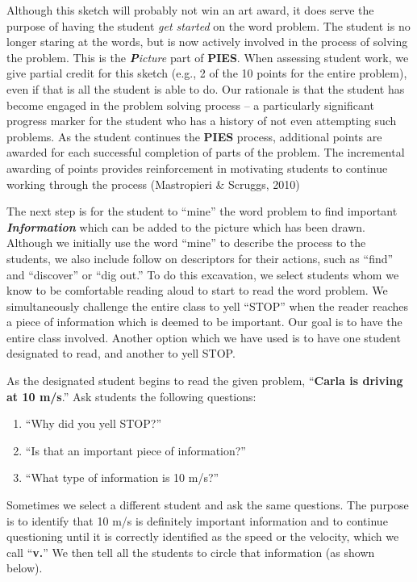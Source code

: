 \documentclass[11.5pt]{sig-alternate} %
\begin{document}
\begin{large}
Although this sketch will probably not win an art award, it does serve the purpose of having the student \textit{get started} on the word problem.  The student is no longer staring at the words, but is now actively involved in the process of solving the problem.  This is the \textit{\textbf{P}icture} part of \textbf{PIES}.  When assessing student work, we give partial credit for this sketch (e.g., 2 of the 10 points for the entire problem), even if that is all the student is able to do.  Our rationale is that the student has become engaged in the problem solving process – a particularly significant progress marker for the student who has a history of not even attempting such problems. As the student continues the \textbf{PIES} process, additional points are awarded for each successful completion of parts of the problem.  The incremental awarding of points provides reinforcement in motivating students to continue working through the process (Mastropieri \& Scruggs, 2010)

The next step is for the student to “mine” the word problem to find important \textbf{\textit{Information}} which can be added to the picture which has been drawn.  Although we initially use the word “mine” to describe the process to the students, we also include follow on descriptors for their actions, such as “find” and “discover” or “dig out.”  To do this excavation, we select students whom we know to be comfortable reading aloud to start to read the word problem.  We simultaneously challenge the entire class to yell “STOP” when the reader reaches a piece of information which is deemed to be important.  Our goal is to have the entire class involved.  Another option which we have used is to have one student designated to read, and another to yell STOP.  

As the designated student begins to read the given problem, “\textbf{Carla is driving at 10 m/s}.” Ask students the following questions:
\begin{enumerate}
    \item “Why did you yell STOP?”
    \item “Is that an important piece of information?”
    \item “What type of information is 10 m/s?”
\end{enumerate}

Sometimes we select a different student and ask the same questions.  The purpose is to identify that 10 m/s is definitely important information and to continue questioning until it is correctly identified as the speed or the velocity, which we call “\textbf{v.}”  We then tell all the students to circle that information (as shown below).


\end{large}
\end{document}
